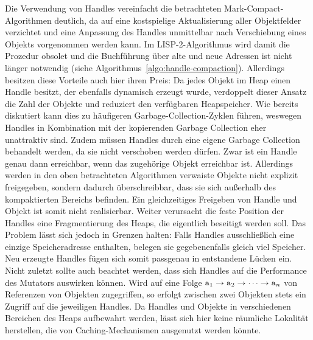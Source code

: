 Die Verwendung von Handles vereinfacht die betrachteten Mark-Compact-Algorithmen deutlich, da auf eine kostspielige Aktualisierung aller Objektfelder verzichtet und eine Anpassung des Handles unmittelbar nach Verschiebung eines Objekts vorgenommen werden kann.
Im LISP-2-Algorithmus wird damit die Prozedur  obsolet und die Buchführung über alte und neue Adressen ist nicht länger notwendig (siehe Algorithmus~\ref{algo:handle-compaction}).
Allerdings besitzen diese Vorteile auch hier ihren Preis:
Da jedes Objekt im Heap einen Handle besitzt, der ebenfalls dynamisch erzeugt wurde, verdoppelt dieser Ansatz die Zahl der Objekte und reduziert den verfügbaren Heapspeicher.
Wie bereits diskutiert kann dies zu häufigeren Garbage-Collection-Zyklen führen, weswegen Handles in Kombination mit der kopierenden Garbage Collection eher unattraktiv sind.
Zudem müssen Handles durch eine eigene Garbage Collection behandelt werden, da sie nicht verschoben werden dürfen.
Zwar ist ein Handle genau dann erreichbar, wenn das zugehörige Objekt erreichbar ist.
Allerdings werden in den oben betrachteten Algorithmen verwaiste Objekte nicht explizit freigegeben, sondern dadurch überschreibbar, dass sie sich außerhalb des kompaktierten Bereichs befinden.
Ein gleichzeitiges Freigeben von Handle und Objekt ist somit nicht realisierbar.
Weiter verursacht die feste Position der Handles eine Fragmentierung des Heaps, die eigentlich beseitigt werden soll.
Das Problem lässt sich jedoch in Grenzen halten:
Falls Handles ausschließlich eine einzige Speicheradresse enthalten, belegen sie gegebenenfalls gleich viel Speicher.
Neu erzeugte Handles fügen sich somit passgenau in entstandene Lücken ein.
Nicht zuletzt sollte auch beachtet werden, dass sich Handles auf die Performance des Mutators auswirken können.
Wird auf eine Folge $\texttt{a}_1 \rightarrow \texttt{a}_2 \rightarrow \dots \rightarrow \texttt{a}_n$ von Referenzen von Objekten zugegriffen, so erfolgt zwischen zwei Objekten stets ein Zugriff auf die jeweiligen Handles.
Da Handles und Objekte in verschiedenen Bereichen des Heaps aufbewahrt werden, lässt sich hier keine räumliche Lokalität herstellen, die von Caching-Mechanismen ausgenutzt werden könnte.

